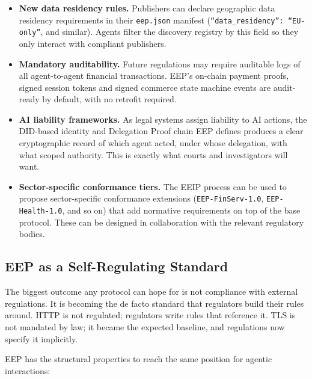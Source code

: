 \documentclass[12pt,a4paper]{article}
\begin{document}
\begin{itemize}
    \item \textbf{New data residency rules.} Publishers can declare geographic data residency requirements in their \texttt{eep.json} manifest (\texttt{``data\_residency'': ``EU-only''}, and similar). Agents filter the discovery registry by this field so they only interact with compliant publishers.
    \item \textbf{Mandatory auditability.} Future regulations may require auditable logs of all agent-to-agent financial transactions. EEP's on-chain payment proofs, signed session tokens and signed commerce state machine events are audit-ready by default, with no retrofit required.
    \item \textbf{AI liability frameworks.} As legal systems assign liability to AI actions, the DID-based identity and Delegation Proof chain EEP defines produces a clear cryptographic record of which agent acted, under whose delegation, with what scoped authority. This is exactly what courts and investigators will want.
    \item \textbf{Sector-specific conformance tiers.} The EEIP process can be used to propose sector-specific conformance extensions (\texttt{EEP-FinServ-1.0}, \texttt{EEP-Health-1.0}, and so on) that add normative requirements on top of the base protocol. These can be designed in collaboration with the relevant regulatory bodies.
\end{itemize}

\subsection{EEP as a Self-Regulating Standard}

The biggest outcome any protocol can hope for is not compliance with external regulations. It is becoming the de facto standard that regulators build their rules around. HTTP is not regulated; regulators write rules that reference it. TLS is not mandated by law; it became the expected baseline, and regulations now specify it implicitly.

EEP has the structural properties to reach the same position for agentic interactions:
\end{document}

